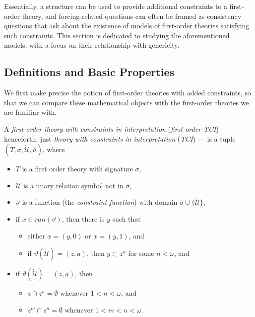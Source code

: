\documentclass[12pt]{article}
\numberwithin{equation}{section}
\begin{document}
Essentially, a structure can be used to provide additional constraints to a first-order theory, and forcing-related questions can often be framed as consistency questions that ask about the existence of models of first-order theories satisfying such constraints. This section is dedicated to studying the aforementioned models, with a focus on their relationship with genericity.

\subsection{Definitions and Basic Properties}\label{subs51}

We first make precise the notion of first-order theories with added constraints, so that we can compare these mathematical objects with the first-order theories we are familiar with. 

\begin{defi}
A \emph{first-order theory with constraints in interpretation} (\emph{first-order TCI}) --- henceforth, just \emph{theory with constraints in interpretation} (\emph{TCI}) --- is a tuple $(T, \sigma, \dot{\mathcal{U}}, \vartheta)$, where
\begin{itemize}
    \item $T$ is a first order theory with signature $\sigma$,
    \item $\dot{\mathcal{U}}$ is a unary relation symbol not in $\sigma$,
    \item $\vartheta$ is a function (the \emph{constraint function}) with domain $\sigma \cup \{\dot{\mathcal{U}}\}$, 
    \item if $x \in ran(\vartheta)$, then there is $y$ such that 
    \begin{itemize}[label=$\circ$]
        \item either $x = (y, 0)$ or $x = (y, 1)$, and
        \item if $\vartheta(\dot{\mathcal{U}}) = (z, a)$, then $y \subset z^n$ for some $n < \omega$, and
    \end{itemize}
    \item if $\vartheta(\dot{\mathcal{U}}) = (z, a)$, then 
    \begin{itemize}[label=$\circ$]
        \item $z \cap z^n = \emptyset$ whenever $1 < n < \omega$, and
        \item $z^m \cap z^n = \emptyset$ whenever $1 < m < n < \omega$.
    \end{itemize}
\end{itemize}
\end{defi}
\end{document}
